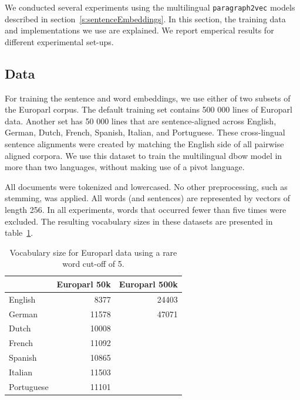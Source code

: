 
We conducted several experiments using the multilingual \texttt{paragraph2vec} models described in section~\ref{s:sentenceEmbeddings}. In this section, the training data and implementations we use are explained. We report emperical results for different experimental set-ups.



\subsection{Data}

For training the sentence and word embeddings, we use either of two subsets of the Europarl corpus.
The default training set contains 500 000 lines of Europarl data.
Another set has 50 000 lines that are sentence-aligned across English, German, Dutch, French, Spanish, Italian, and Portuguese.
These cross-lingual sentence alignments were created by matching the English side of all pairwise aligned corpora.
We use this dataset to train the multilingual dbow model in more than two languages, without making use of a pivot language.

All documents were tokenized and lowercased. No other preprocessing, such as stemming, was applied.
All words (and sentences) are represented by vectors of length 256.
In all experiments, words that occurred fewer than five times were excluded.
The resulting vocabulary sizes in these datasets are presented  in table~\ref{t:vocabularies}.

\begin{table}[ht]
\center
\begin{tabular}{l| r r}
		&Europarl 50k 	&Europarl 500k\\\hline
English	&8377			&24403	\\	
German	&11578		&47071	\\
Dutch		&10008				\\
French	&11092				\\	
Spanish	&10865				\\
Italian		&11503				\\
Portuguese	&11101				\\
\end{tabular}
\caption{Vocabulary size for Europarl data using a rare word cut-off of 5.}
\label{t:vocabularies}
\end{table}

